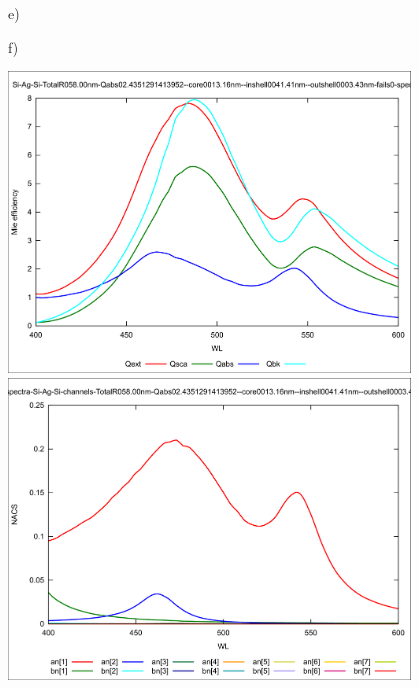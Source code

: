 \documentclass[a4paper]{article}
\begin{document}
\begin{figure}
\begin{minipage}[h]{0.49\textwidth}
  \end{minipage}  
  \begin{minipage}[h]{0.49\textwidth}    \begin{flushleft}     e)    \end{flushleft}
  \end{minipage}
  \begin{minipage}[h]{0.49\textwidth}    \begin{flushleft}     f)    \end{flushleft}
  \end{minipage}
  \begin{minipage}[h]{0.49\textwidth} 
   \includegraphics[width=0.95\textwidth]{band80-e}
  \end{minipage}
  \begin{minipage}[h]{0.49\textwidth} 
    \includegraphics[width=0.95\textwidth]{band80-e-ch}

\end{minipage}
\end{figure}
\end{document}
